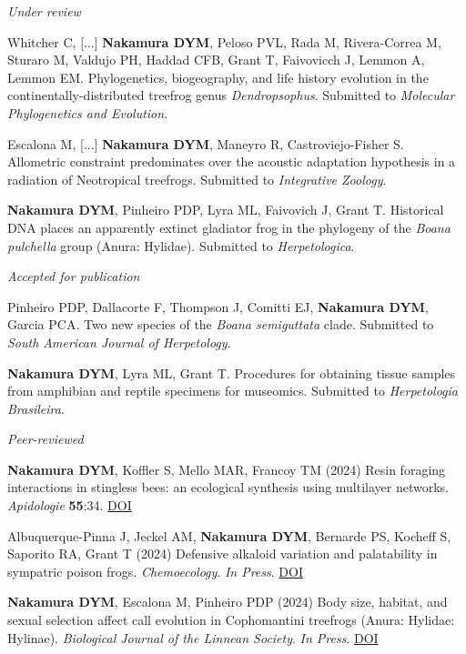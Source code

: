 \documentclass[margin, 10pt]{res} %
\begin{document}
\begin{resume}
{\sl Under review}
\begin{etaremune}
\item Whitcher C, [...] \textbf{Nakamura DYM}, Peloso PVL, Rada M, Rivera-Correa M, Sturaro M, Valdujo PH, Haddad CFB, Grant T, Faivovicch J, Lemmon A, Lemmon EM. Phylogenetics, biogeography, and life history evolution in the continentally-distributed treefrog genus \emph{Dendropsophus}. Submitted to \emph{Molecular Phylogenetics and Evolution}.
\item Escalona M, [...] \textbf{Nakamura DYM}, Maneyro R, Castroviejo-Fisher S. Allometric constraint predominates over the acoustic adaptation hypothesis in a radiation of Neotropical treefrogs. Submitted to \emph{Integrative Zoology}.
\item \textbf{Nakamura DYM}, Pinheiro PDP, Lyra ML, Faivovich J, Grant T. Historical DNA places an apparently extinct gladiator frog in the phylogeny of the \emph{Boana pulchella} group (Anura: Hylidae). Submitted to \emph{Herpetologica}. 
\end{etaremune}

{\sl Accepted for publication}
\begin{etaremune}
\item Pinheiro PDP, Dallacorte F, Thompson J, Comitti EJ, \textbf{Nakamura DYM}, Garcia PCA. Two new species of the \emph{Boana semiguttata} clade. Submitted to \emph{South American Journal of Herpetology}. 
\item \textbf{Nakamura DYM}, Lyra ML, Grant T. Procedures for obtaining tissue samples from amphibian and reptile specimens for museomics. Submitted to \emph{Herpetologia Brasileira}. 
\end{etaremune}

{\sl Peer-reviewed}
\begin{etaremune}
\item \textbf{Nakamura DYM}, Koffler S, Mello MAR, Francoy TM (2024) Resin foraging interactions in stingless bees: an ecological synthesis using multilayer networks. \emph{Apidologie} \textbf{55}:34.  \href{https://doi.org/10.1007/s13592-024-01082-8}{DOI}
\item Albuquerque-Pinna J, Jeckel AM, \textbf{Nakamura DYM}, Bernarde PS, Kocheff S, Saporito RA, Grant T (2024) Defensive alkaloid variation and palatability in sympatric poison frogs. \emph{Chemoecology}. \emph{In Press}. \href{https://doi.org/10.1007/s00049-024-00402-9}{DOI} 
\item \textbf{Nakamura DYM}, Escalona M, Pinheiro PDP (2024) Body size, habitat, and sexual selection affect call evolution in Cophomantini treefrogs (Anura: Hylidae: Hylinae). \emph{Biological Journal of the Linnean Society}. \emph{In Press}. \href{https://doi.org/10.1093/biolinnean/blae036}{DOI}
\end{etaremune}


\end{resume}
\end{document}
